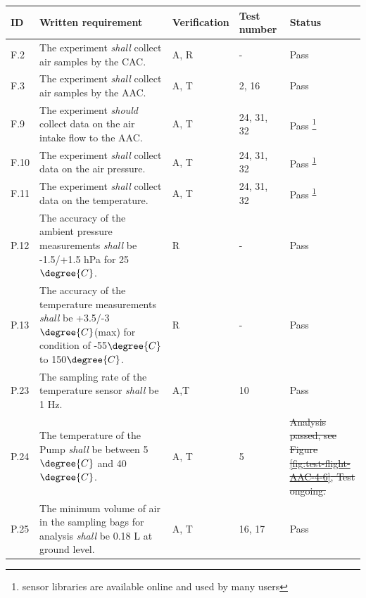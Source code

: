 \documentclass[a4paper,12pt,oneside]{article}
\providecommand{\DIFaddtex}[1]{{\protect\color{blue}\uwave{#1}}} %
\providecommand{\DIFdeltex}[1]{{\protect\color{red}\sout{#1}}}                      %
\providecommand{\DIFaddbegin}{} %
\providecommand{\DIFaddend}{} %
\providecommand{\DIFdelbegin}{} %
\providecommand{\DIFdelend}{} %
\providecommand{\DIFadd}[1]{\texorpdfstring{\DIFaddtex{#1}}{#1}} %
\providecommand{\DIFdel}[1]{\texorpdfstring{\DIFdeltex{#1}}{}} %
\newcommand{\DIFscaledelfig}{0.5}
\newlength{\DIFdelgraphicswidth} %
\newlength{\DIFdelgraphicsheight} %
\newcommand{\DIFaddincludegraphics}[2][]{{\color{blue}\fbox{\DIFOincludegraphics[#1]{#2}}}} %
\newcommand{\DIFdelincludegraphics}[2][]{%
\sbox{\DIFdelgraphicsbox}{\DIFOincludegraphics[#1]{#2}}%
\settoboxwidth{\DIFdelgraphicswidth}{\DIFdelgraphicsbox} %
\settoboxtotalheight{\DIFdelgraphicsheight}{\DIFdelgraphicsbox} %
\scalebox{\DIFscaledelfig}{%
\parbox[b]{\DIFdelgraphicswidth}{\usebox{\DIFdelgraphicsbox}\\[-\baselineskip] \rule{\DIFdelgraphicswidth}{0em}}\llap{\resizebox{\DIFdelgraphicswidth}{\DIFdelgraphicsheight}{%
\setlength{\unitlength}{\DIFdelgraphicswidth}%
\begin{picture}(1,1)%
\thicklines\linethickness{2pt} %
{\color[rgb]{1,0,0}\put(0,0){\framebox(1,1){}}}%
{\color[rgb]{1,0,0}\put(0,0){\line( 1,1){1}}}%
{\color[rgb]{1,0,0}\put(0,1){\line(1,-1){1}}}%
\end{picture}%
}\hspace*{3pt}}} %
} %
\DeclareRobustCommand{\DIFaddbegin}{\DIFOaddbegin \let\includegraphics\DIFaddincludegraphics} %
\DeclareRobustCommand{\DIFaddend}{\DIFOaddend \let\includegraphics\DIFOincludegraphics} %
\DeclareRobustCommand{\DIFdelbegin}{\DIFOdelbegin \let\includegraphics\DIFdelincludegraphics} %
\DeclareRobustCommand{\DIFdelend}{\DIFOaddend \let\includegraphics\DIFOincludegraphics} %
\begin{document}
\begin{longtable}[]{|m{}| m{} |m{} |m{}|m{}|}

\hline
\textbf{ID}   & \textbf{Written requirement}                                                                                                                                                     & \textbf{Verification} & \textbf{Test number} & \textbf{Status} \\ \hline
F.2  & The experiment \textit{shall} collect air samples by the CAC.&  A, R & - & Pass \\ \hline %
F.3  & The experiment \textit{shall} collect air samples by the AAC. & A, T& 2, 16 & Pass\\ \hline %
F.9  & The experiment \textit{should} collect data on the air intake flow to the AAC. & A, T & 24, 31, 32 & Pass \footnote{sensor libraries are available online and used by many users\label{fn:sensor-libraries}}\\ \hline
F.10 & The experiment \textit{shall} collect data on the air pressure. & A, T& 24, 31, 32 & Pass \textsuperscript{\ref{fn:sensor-libraries}}\\ \hline
F.11 & The experiment \textit{shall} collect data on the temperature. &  A, T& 24, 31, 32 & Pass \textsuperscript{\ref{fn:sensor-libraries}}\\ \hline



P.12 & The accuracy of the ambient pressure measurements \textit{shall} be -1.5/+1.5 hPa for 25$\degree{C}$.                                                                              &        R      &  -          & Pass        \\ \hline %
P.13 & The accuracy of the temperature measurements \textit{shall} be +3.5/-3$\degree{C}$(max) for condition of -55$\degree{C}$ to 150$\degree{C}$.                                   &       R       & -            &    Pass   \\ \hline %


P.23 & The sampling rate of the temperature sensor \textit{shall} be 1 Hz.                                                                                    &         A,T     & 10            &  Pass       \\ \hline %
P.24 & The temperature of the Pump \textit{shall} be between 5$\degree{C}$ and 40$\degree{C}$.                                                                                                    &       A, T       & 5           & \DIFdelbegin \DIFdel{Analysis passed, see Figure \ref{fig:test-flight-AAC-4-6}, Test ongoing.        }\DIFdelend \DIFaddbegin \DIFadd{Pass        }\DIFaddend \\ \hline
P.25 & The minimum volume of air in the sampling bags for analysis \textit{shall} be 0.18 L at ground level.                                                                                                    &       A, T       & 16, 17            &  Pass                     \\ \hline


\end{longtable}
\end{document}
